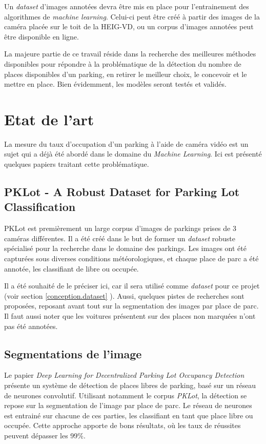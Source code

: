 Un \textit{dataset} d'images annotées devra être mis en place pour l'entrainement des algorithmes de \textit{machine learning}. Celui-ci peut être créé à partir des images de la caméra placée sur le toit de la HEIG-VD, ou un corpus d'images annotées peut être disponible en ligne.

La majeure partie de ce travail réside dans la recherche des meilleures méthodes disponibles pour répondre à la problématique de la détection du nombre de places disponibles d'un parking, en retirer le meilleur choix, le concevoir et le mettre en place. Bien évidemment, les modèles seront testés et validés.

\section{Etat de l'art}

La mesure du taux d'occupation d'un parking à l'aide de caméra vidéo est un sujet qui a déjà été abordé dans le domaine du \textit{Machine Learning}. Ici est présenté quelques papiers traitant cette problématique. 

\subsection{PKLot - A Robust Dataset for Parking Lot Classification}

PKLot est premièrement un large corpus d'images de parkings prises de 3 caméras différentes. Il a été créé dans le but de former un \textit{dataset} robuste spécialisé pour la recherche dans le domaine des parkings. Les images ont été capturées sous diverses conditions météorologiques, et chaque place de parc a été annotée, les classifiant de libre ou occupée.\autocite{paper:pklot}

Il a été souhaité de le préciser ici, car il sera utilisé comme \textit{dataset} pour ce projet (voir section \ref{conception.dataset} ). Aussi, quelques pistes de recherches sont proposées, reposant avant tout sur la segmentation des images par place de parc. Il faut aussi noter que les voitures présentent sur des places non marquées n'ont pas été annotées.

\subsection{Segmentations de l'image}
Le papier \textit{Deep Learning for Decentralized Parking Lot Occupancy Detection} présente un système de détection de places libres de parking, basé sur un réseau de neurones convolutif. Utilisant notamment le corpus \textit{PKLot}, la détection se repose sur la segmentation de l'image par place de parc. Le réseau de neurones est entrainé sur chacune de ces parties, les classifiant en tant que place libre ou occupée. Cette approche apporte de bons résultats, où les taux de réussites peuvent dépasser les 99\%. \autocite{paper:dlp}

